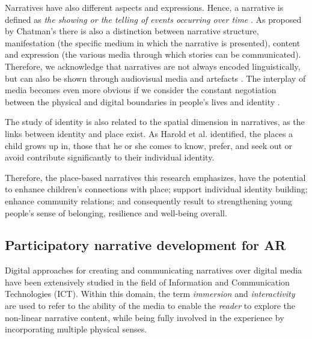 \documentclass[acmlarge,screen,dvipsnames]{acmart}
\begin{document}
Narratives have also different aspects and expressions. Hence, a narrative is defined as \emph{the showing or the telling of events occurring over time} \cite{10.2307/1343711}. As proposed by Chatman's \cite{10.2307/468421} there is also a distinction between narrative structure, manifestation (the specific medium in which the narrative is presented), content and expression (the various media through which stories can be communicated). Therefore, we acknowledge that narratives are not always encoded linguistically, but can also be shown through audiovisual media and artefacts \cite{PAHL2004339}. The interplay of media becomes even more obvious if we consider the constant negotiation between the physical and digital boundaries in people’s lives and identity \cite{Jordan2009}. 

The study of identity is also related to the spatial dimension in narratives, as the links between identity and place exist. As Harold et al. \cite{PROSHANSKY198357} identified, the places a child grows up in, those that he or she comes to know, prefer, and seek out or avoid contribute significantly to their individual identity.

Therefore, the place-based narratives this research emphasizes, have the potential to enhance children's connections with place; support individual identity building; enhance community relations; and consequently result to strengthening young people's sense of belonging, resilience and well-being overall.

\subsection{Participatory narrative development for AR}

Digital approaches for creating and communicating narratives over digital media have been extensively studied in the field of Information and Communication Technologies (ICT). Within this domain, the term \emph{immersion} and \emph{interactivity} are used to refer to the ability of the media to enable the \emph{reader} to explore the non-linear narrative content, while being fully involved in the experience by incorporating multiple physical senses.
\end{document}
